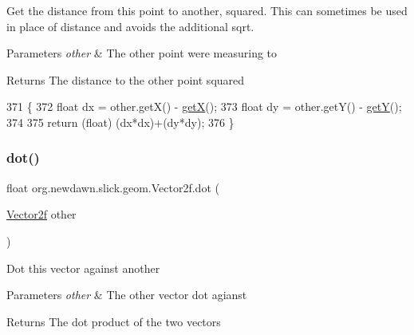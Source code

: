 Get the distance from this point to another, squared. This can sometimes be used in place of distance and avoids the additional sqrt.


\begin{DoxyParams}{Parameters}
{\em other} & The other point we\textquotesingle{}re measuring to \\
\hline
\end{DoxyParams}
\begin{DoxyReturn}{Returns}
The distance to the other point squared 
\end{DoxyReturn}

\begin{DoxyCode}
371                                                  \{
372         \textcolor{keywordtype}{float} dx = other.getX() - \mbox{\hyperlink{classorg_1_1newdawn_1_1slick_1_1geom_1_1_vector2f_ad706bc5b80f139236e643a274947262b}{getX}}();
373         \textcolor{keywordtype}{float} dy = other.getY() - \mbox{\hyperlink{classorg_1_1newdawn_1_1slick_1_1geom_1_1_vector2f_aa26075f083c1ce0c8c87536bc008cc8c}{getY}}();
374         
375         \textcolor{keywordflow}{return} (\textcolor{keywordtype}{float}) (dx*dx)+(dy*dy);
376     \}
\end{DoxyCode}
\mbox{\label{classorg_1_1newdawn_1_1slick_1_1geom_1_1_vector2f_ab3e17137fcdc8a6e78e8c3599a09c336}} 
\subsubsection{\texorpdfstring{dot()}{dot()}}
{\footnotesize\ttfamily float org.\+newdawn.\+slick.\+geom.\+Vector2f.\+dot (\begin{DoxyParamCaption}\item[{\mbox{\hyperlink{classorg_1_1newdawn_1_1slick_1_1geom_1_1_vector2f}{Vector2f}}}]{other }\end{DoxyParamCaption})\hspace{0.3cm}{\ttfamily [inline]}}

Dot this vector against another


\begin{DoxyParams}{Parameters}
{\em other} & The other vector dot agianst \\
\hline
\end{DoxyParams}
\begin{DoxyReturn}{Returns}
The dot product of the two vectors 
\end{DoxyReturn}

